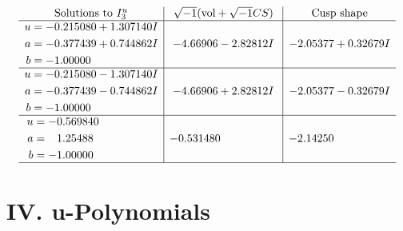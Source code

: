 \documentclass[1p]{elsarticle_modified}
\theoremstyle{definition}
\newcommand{\I}{\sqrt{-1}}
\begin{document}
$$\begin{array}{c|c|c}  
\text{Solutions to }I^u_{3}& \I (\text{vol} + \sqrt{-1}CS) & \text{Cusp shape}\\
 \hline 
\begin{aligned}
u &= -0.215080 + 1.307140 I \\
a &= -0.377439 + 0.744862 I \\
b &= -1.00000\phantom{ +0.000000I}\end{aligned}
 & -4.66906 - 2.82812 I & -2.05377 + 0.32679 I \\ \hline\begin{aligned}
u &= -0.215080 - 1.307140 I \\
a &= -0.377439 - 0.744862 I \\
b &= -1.00000\phantom{ +0.000000I}\end{aligned}
 & -4.66906 + 2.82812 I & -2.05377 - 0.32679 I \\ \hline\begin{aligned}
u &= -0.569840\phantom{ +0.000000I} \\
a &= \phantom{-}1.25488\phantom{ +0.000000I} \\
b &= -1.00000\phantom{ +0.000000I}\end{aligned}
 & -0.531480\phantom{ +0.000000I} & -2.14250\phantom{ +0.000000I}\\
 \hline 
 \end{array}$$\newpage
\newpage\renewcommand{\arraystretch}{1}
\centering \section*{ IV. u-Polynomials}
\end{document}
